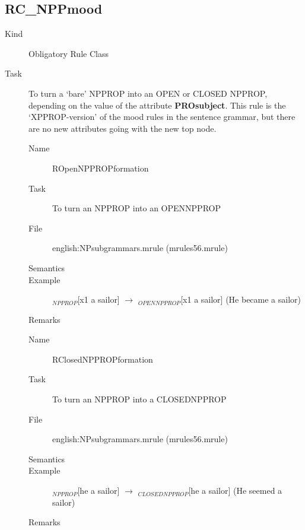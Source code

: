 \subsection{RC\_NPPmood}
\begin{description}
\item[Kind] Obligatory Rule Class
\item[Task] To turn a `bare' NPPROP into an OPEN or CLOSED NPPROP, depending on 
the value of the attribute {\bf PROsubject}. This rule is the `XPPROP-version' 
of the mood rules in the sentence grammar, but there are no new attributes 
going with the new top node.

\vspace{1 cm}
\begin{description}
\item[Name] ROpenNPPROPformation
\item[Task] To turn an NPPROP into an OPENNPPROP
\item[File] english:NPsubgrammars.mrule (mrules56.mrule)
\item[Semantics]
\item[Example] $_{NPPROP}$[x1 a sailor] $\rightarrow$ $_{OPENNPPROP}$[x1 
a sailor] (He became a sailor)
\item[Remarks] 
\end{description}

\vspace{1 cm}
\begin{description}
\item[Name] RClosedNPPROPformation
\item[Task] To turn an NPPROP into a CLOSEDNPPROP
\item[File] english:NPsubgrammars.mrule (mrules56.mrule)
\item[Semantics]
\item[Example] $_{NPPROP}$[he a sailor] $\rightarrow$ $_{CLOSEDNPPROP}$[he
a sailor] (He seemed a sailor)
\item[Remarks] 
\end{description}

\end{description}

\newpage

